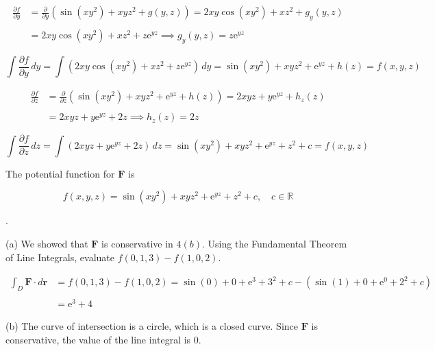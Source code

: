 \documentclass{article}
\begin{document}
\begin{align*}\frac{\partial f}{\partial y}&=\frac{\partial}{\partial y}\left(\sin\left(xy^2\right)+xyz^2+g(y,z)\right)=2xy\cos\left(xy^2\right)+xz^2+g_y(y,z)\\\\&=2xy\cos\left(xy^2\right)+xz^2+z\mathrm{e}^{yz}\implies g_y(y,z)=z\mathrm{e}^{yz}\end{align*}

\[\int\frac{\partial f}{\partial y}\,dy=\int\left(2xy\cos\left(xy^2\right)+xz^2+z\mathrm{e}^{yz}\right)\,dy=\sin\left(xy^2\right)+xyz^2+\mathrm{e}^{yz}+h(z)=f(x,y,z)\]

\begin{align*}\frac{\partial f}{\partial z}&=\frac{\partial}{\partial z}\left(\sin\left(xy^2\right)+xyz^2+\mathrm{e}^{yz}+h(z)\right)=2xyz+y\mathrm{e}^{yz}+h_z(z)\\\\&=2xyz+y\mathrm{e}^{yz}+2z\implies h_z(z)=2z\end{align*}

\[\int\frac{\partial f}{\partial z}\,dz=\int\left(2xyz+y\mathrm{e}^{yz}+2z\right)\,dz=\sin\left(xy^2\right)+xyz^2+\mathrm{e}^{yz}+z^2+c=f(x,y,z)\]

\hfill

\noindent The potential function for $\mathbf{F}$ is

\[\boxed{f(x,y,z)=\sin\left(xy^2\right)+xyz^2+\mathrm{e}^{yz}+z^2+c,\quad c\in\mathbb{R}}\]

\hfill

.

\hfill

\noindent (a) We showed that $\mathbf{F}$ is conservative in $4(b)$. Using the Fundamental Theorem of Line Integrals, evaluate $f(0,1,3)-f(1,0,2)$.

\begin{align*}\int_D\mathbf{F}\cdot d\mathbf{r}&=f(0,1,3)-f(1,0,2)=\sin\left(0\right)+0+\mathrm{e}^{3}+3^2+c-\left(\sin\left(1\right)+0+\mathrm{e}^{0}+2^2+c\right)\\\\&=\boxed{\mathrm{e}^3+4}\end{align*}

\hfill

\noindent (b) The curve of intersection is a circle, which is a closed curve. Since $\mathbf{F}$ is conservative, the value of the line integral is $\boxed0$.

\hfill
\end{document}
